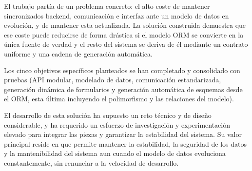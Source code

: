 El trabajo partía de un problema concreto: el alto coste de mantener
sincronizados backend, comunicación e interfaz ante un modelo de datos en
evolución, y de mantener esta actualizada. La solución construida demuestra que ese coste puede reducirse de
forma drástica si el modelo ORM se convierte en la única fuente de verdad y el
resto del sistema se deriva de él mediante un contrato uniforme y una cadena
de generación automática.

Los cinco objetivos específicos planteados se han completado y consolidado
con pruebas (API modular, modelado de datos, comunicación estandarizada,
generación dinámica de formularios y generación automática de esquemas desde
el ORM, esta última incluyendo el polimorfismo y las relaciones del modelo).

El desarrollo de esta solución ha supuesto un reto técnico y de diseño
considerable, y ha requerido un esfuerzo de investigación y experimentación
elevado para integrar las piezas y garantizar la estabilidad del sistema. Su
valor principal reside en que permite mantener la estabilidad, la seguridad de
los datos y la mantenibilidad del sistema aun cuando el modelo de datos
evoluciona constantemente, sin renunciar a la velocidad de desarrollo.